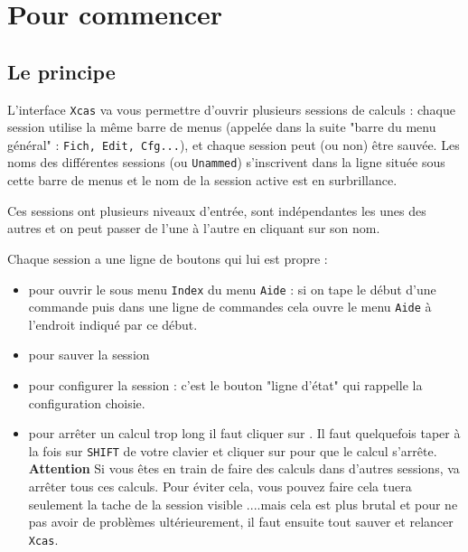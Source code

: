 \documentclass[a4paper,11pt]{article}
\begin{document}
\section{Pour commencer}
\subsection{Le principe}
L'interface  {\tt Xcas} va vous permettre d'ouvrir plusieurs sessions de 
calculs : chaque session utilise la m\^eme barre de menus (appel\'ee dans la  
suite "barre du menu g\'en\'eral" : {\tt Fich, Edit, Cfg...}), et chaque 
session peut (ou non) \^etre sauv\'ee. Les noms des diff\'erentes sessions (ou 
{\tt Unammed}) s'inscrivent dans la ligne situ\'ee sous cette 
barre de menus et le nom de la session active est en surbrillance. 

Ces sessions ont plusieurs niveaux 
d'entr\'ee, sont ind\'ependantes les unes des autres 
et on peut passer de l'une \`a l'autre en cliquant sur son nom.

Chaque session a une ligne de boutons qui lui est propre :
\begin{itemize}
\item {} pour ouvrir le sous menu {\tt Index} 
du menu {\tt Aide} : si on tape le d\'ebut d'une commande puis 
dans une ligne de commandes cela ouvre le menu {\tt Aide} \`a l'endroit 
indiqu\'e par ce d\'ebut.
\item  {} pour sauver la session 
\item {} pour configurer la 
session : c'est le bouton "ligne d'\'etat" qui rappelle la configuration 
choisie.  
\item {} pour arr\^eter un calcul trop long il faut cliquer sur
. Il faut 
quelquefois taper \`a la fois sur {\tt SHIFT} de votre clavier et cliquer sur 
 pour que le calcul s'arr\^ete.\\
{\bf Attention} Si vous \^etes en train de faire des calculs dans d'autres 
sessions,  va arr\^eter tous ces calculs. Pour \'eviter 
cela, vous pouvez faire   cela tuera seulement la 
tache de la session visible ....mais cela est plus brutal et pour ne pas avoir 
de probl\`emes ult\'erieurement, il faut ensuite tout sauver et relancer 
{\tt Xcas}.
\end{itemize}
\end{document}
